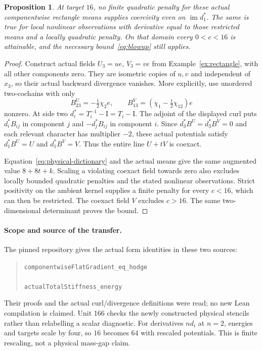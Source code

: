 \documentclass[11pt,a4paper]{article}
\newtheorem{proposition}[theorem]{Proposition}
\newcommand{\im}{\operatorname{im}}
\newcommand{\id}{\mathrm I}
\begin{document}
\begin{proposition}\label{prop:coexact}
At target $16$, no finite quadratic penalty for these actual componentwise
rectangle means supplies coercivity even on $\im d_1^*$. The same is true
for local nonlinear observations with derivative equal to those restricted
means and a locally quadratic penalty. On that domain every $0<c<16$ is
attainable, and the necessary bound~\eqref{eq:blowup} still applies.
\end{proposition}
\begin{proof}
Construct actual fields $U_3=ue$, $V_3=ve$ from Example~\ref{ex:rectangle},
with all other components zero. They are isometric copies of $u,v$ and
independent of $x_3$, so their actual backward divergence vanishes.
More explicitly, use unordered two-cochains with only
\[
 B^U_{23}=-\tfrac12\chi_2 e,\qquad
 B^V_{13}=(\chi_1-\tfrac12\chi_{12})e
\]
nonzero. At side two $d_i^*=T_i^{-1}-\id=T_i-\id$. The adjoint of the
displayed curl puts $d_i^*B_{ij}$ in component $j$ and $-d_j^*B_{ij}$ in
component $i$. Since $d_3^*B^U=d_3^*B^V=0$ and each relevant character
has multiplier $-2$, these actual potentials satisfy $d_1^*B^U=U$ and
$d_1^*B^V=V$. Thus the entire line $U+tV$ is coexact.

Equation~\eqref{eq:physical-dictionary} and the actual means give the same
augmented value $8+8t+k$. Scaling a violating coexact field towards zero
also excludes locally bounded quadratic penalties and the stated nonlinear
observations. Strict positivity on the ambient kernel supplies a finite
penalty for every $c<16$, which can then be restricted. The coexact field
$V$ excludes $c>16$. The same two-dimensional determinant proves the bound.
\end{proof}

\paragraph{Scope and source of the transfer.}
The pinned repository gives the actual form identities in these two sources:
\begin{quote}\small
\texttt{componentwiseFlatGradient\_eq\_hodge}\\
\\[4pt]
\texttt{actualTotalStiffness\_energy}\\
\end{quote}
Their proofs and the actual curl/divergence definitions were read; no new Lean compilation is
claimed. Unit 166 checks the newly constructed physical stencils rather
than relabelling a scalar diagnostic. For derivatives $nd_i$ at $n=2$,
energies and targets scale by four, so $16$ becomes $64$ with rescaled
potentials. This is finite rescaling, not a physical mass-gap claim.
\end{document}
